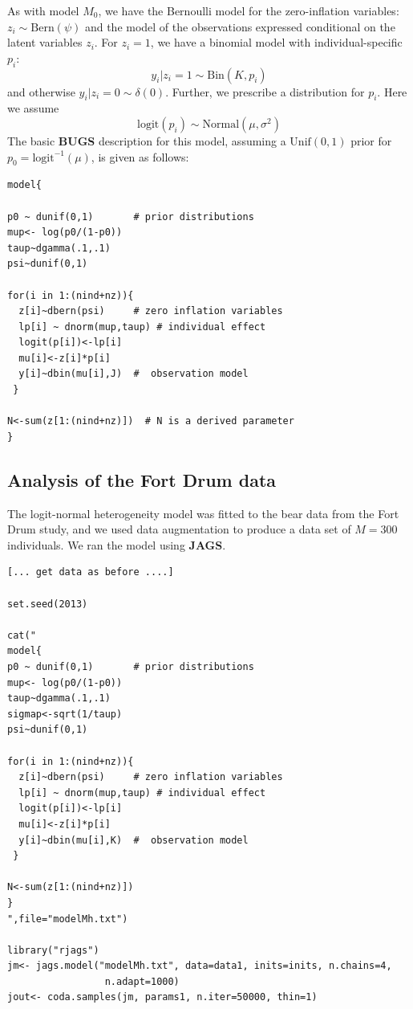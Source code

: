As with model $M_{0}$, we have the Bernoulli model for the
zero-inflation variables: $z_{i} \sim \mbox{Bern}(\psi)$ and the model
of the observations expressed conditional on the latent variables
$z_{i}$. For $z_{i}=1$, we have a binomial model with
individual-specific $p_{i}$:
\[
y_{i}|{z_{i} \! = \! 1} \sim \mbox{Bin}(K,p_{i})
\]
and otherwise $y_{i} |{ z_{i} \! = \! 0} \sim \delta(0)$. Further, we
prescribe a distribution for $p_{i}$. Here we assume
\[
\mathrm{logit}(p_{i}) \sim \mbox{Normal}(\mu,\sigma^2)
\]
The basic {\bf BUGS} description for this model, assuming a
$\mbox{Unif}(0,1)$ prior for $p_{0} = \mbox{logit}^{-1}(\mu)$, is given
as follows:
{\small 
\begin{verbatim}
model{

p0 ~ dunif(0,1)       # prior distributions
mup<- log(p0/(1-p0))
taup~dgamma(.1,.1)
psi~dunif(0,1)

for(i in 1:(nind+nz)){
  z[i]~dbern(psi)     # zero inflation variables
  lp[i] ~ dnorm(mup,taup) # individual effect
  logit(p[i])<-lp[i]
  mu[i]<-z[i]*p[i]
  y[i]~dbin(mu[i],J)  #  observation model
 }

N<-sum(z[1:(nind+nz)])  # N is a derived parameter
}
\end{verbatim}
} 


\subsection{Analysis of the Fort Drum data}

The logit-normal heterogeneity model was fitted to the bear data from
the Fort Drum study, and we used data augmentation to produce a data
set of $M=300$ individuals.  We ran the model using {\bf JAGS}.

\begin{verbatim}
[... get data as before ....]

set.seed(2013)

cat("
model{
p0 ~ dunif(0,1)       # prior distributions
mup<- log(p0/(1-p0))
taup~dgamma(.1,.1)
sigmap<-sqrt(1/taup)
psi~dunif(0,1)

for(i in 1:(nind+nz)){
  z[i]~dbern(psi)     # zero inflation variables
  lp[i] ~ dnorm(mup,taup) # individual effect
  logit(p[i])<-lp[i]
  mu[i]<-z[i]*p[i]
  y[i]~dbin(mu[i],K)  #  observation model
 }

N<-sum(z[1:(nind+nz)])
}
",file="modelMh.txt")

library("rjags")
jm<- jags.model("modelMh.txt", data=data1, inits=inits, n.chains=4,
                 n.adapt=1000)
jout<- coda.samples(jm, params1, n.iter=50000, thin=1)
\end{verbatim}


